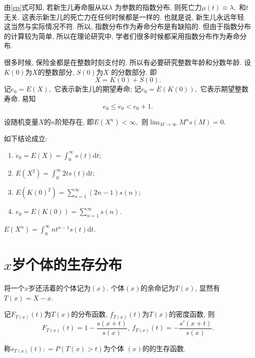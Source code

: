 \documentclass[lang=cn,10pt]{elegantbook}
\begin{document}
\begin{remark}
    由\eqref{ep}式可知, 若新生儿寿命服从以$\lambda$ 为参数的指数分布, 则死亡力$\mu(t)\equiv \lambda,$ 和$t$ 无关. 这表示新生儿的死亡力在任何时候都是一样的. 也就是说, 新生儿永远年轻. 这当然与实际情况不符. 所以, 指数分布作为寿命分布是有缺陷的. 但由于指数分布的计算较为简单, 所以在理论研究中, 学者们很多时候都采用指数分布作为寿命分布.
\end{remark}

\begin{definition}[整数年龄与分数年龄]
	很多时候, 保险金都是在整数时刻支付的. 所以有必要研究整数年龄和分数年龄. 设$K(0)$为$X$的整数部分, $S(0)$为$X$ 的分数部分. 即
$$X = K(0) + S(0).$$
记$\mathring{e}_0 = E(X),$ 它表示新生儿的期望寿命; 记$e_0 = E(K(0)),$ 它表示期望整数寿命. 易知
\begin{equation*}
    e_0 \le \mathring{e}_0 < e_0 + 1.
\end{equation*}
\end{definition}

\begin{lemma}\label{lemm0}
    设随机变量$X$的$n$阶矩存在, 即$E(X^n) < \infty,$ 则$\lim_{M \rightarrow \infty}M^ns(M) = 0.$
\end{lemma}

\begin{corollary}如下结论成立:
    \begin{enumerate}
         \item $\mathring{e}_0 = E(X) = \int_0^{\infty}s(t)\mathrm{d}t;$
        \item $E(X^2) = \int_{0}^{\infty} 2ts(t)\mathrm{d}t;$
        \item $E(K(0)^2) = \sum_{n = 1}^{\infty} (2n-1)s(n);$
        \item $e_0=E(K(0)) = \sum_{n = 1}^{\infty} s(n).$
    \end{enumerate}
\end{corollary}

\begin{remark}
	$E(X^n)=\int_0^\infty nt^{n-1}s(t)\mathrm{d}t$.
\end{remark}

\section{$x$岁个体的生存分布}

\begin{definition}
	将一个$x$岁还活着的个体记为$(x).$ 个体$(x)$的余命记为$T(x)$, 显然有$T(x)=X-x$.

	记$F_{T(x)}(t)$为$T(x)$的分布函数, $f_{T(x)}(t)$为$T(x)$的密度函数, 则$$F_{T(x)}(t) = 1 - \frac{s(x+t)}{s(x)}, ~f_{T(x)}(t) = -\frac{s'(x+t)}{s(x)}.$$

	称$s_{T(x)}(t): = P(T(x)>t)$为个体 $(x)$的的生存函数.
\end{definition}
\end{document}
